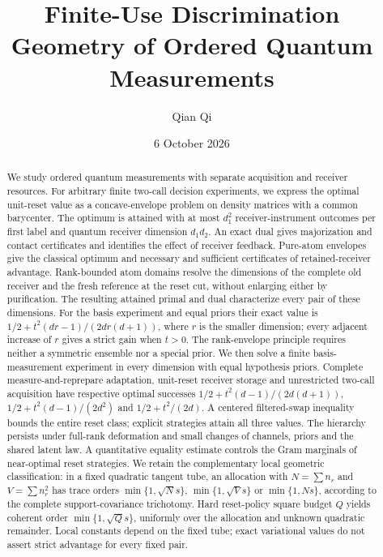 \documentclass[11pt]{amsart}
\title[Finite-use discrimination geometry]{Finite-Use Discrimination Geometry of Ordered Quantum Measurements}
\author{Qian Qi}
\date{6 October 2026}
\numberwithin{equation}{section}
\theoremstyle{definition}\newtheorem{definition}[theorem]{Definition}
\theoremstyle{remark}\newtheorem{remark}[theorem]{Remark}
\begin{document}
\raggedbottom
\begin{abstract}
We study ordered quantum measurements with separate acquisition and
receiver resources.  For arbitrary finite two-call decision experiments,
we express the optimal unit-reset value as a concave-envelope problem
on density matrices with a common barycenter.  The optimum is attained
with at most $d_1^2$ receiver-instrument outcomes per first label and
quantum receiver dimension $d_1d_2$.  An exact dual gives majorization
and contact certificates and identifies the effect of receiver feedback.
Pure-atom envelopes give the classical optimum and necessary and
sufficient certificates of retained-receiver advantage.
Rank-bounded atom domains resolve the dimensions of the complete old
receiver and the fresh reference at the reset cut, without enlarging
either by purification.  The resulting attained primal and dual
characterize every pair of these dimensions.  For the basis experiment
and equal priors their exact value is
$1/2+t^2(dr-1)/(2dr(d+1))$, where $r$ is the smaller dimension;
every adjacent increase of $r$ gives a strict gain when $t>0$.
The rank-envelope principle requires neither a symmetric ensemble
nor a special prior.
We then solve a finite basis-measurement experiment in every dimension
with equal hypothesis priors.  Complete measure-and-reprepare adaptation,
unit-reset receiver storage and unrestricted two-call acquisition have
respective optimal successes $1/2+t^2(d-1)/(2d(d+1))$,
$1/2+t^2(d-1)/(2d^2)$ and $1/2+t^2/(2d)$.
A centered filtered-swap inequality bounds the entire reset class;
explicit strategies attain all three values.  The hierarchy persists
under full-rank deformation and small changes of channels, priors and
the shared latent law.  A quantitative equality estimate controls the
Gram marginals of near-optimal reset strategies.  We retain the complementary local geometric
classification: in a fixed quadratic tangent tube, an allocation with
$N=\sum n_r$ and $V=\sum n_r^2$ has trace orders
$\min\{1,\sqrt Ns\}$, $\min\{1,\sqrt Vs\}$ or $\min\{1,Ns\}$,
according to the complete support-covariance trichotomy.
Hard reset-policy square budget $Q$ yields coherent order
$\min\{1,\sqrt Qs\}$, uniformly over the allocation and unknown quadratic
remainder.  Local constants depend on the fixed tube; exact variational
values do not assert strict advantage for every fixed pair.
\end{abstract}
\maketitle
\end{document}
